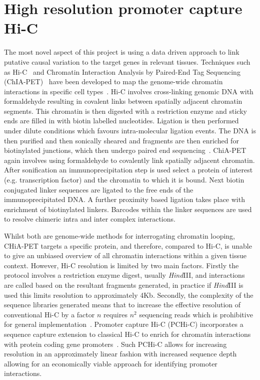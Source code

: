 \documentclass[a4paper,11pt]{report}
\begin{document}
\section{High resolution promoter capture Hi-C}
The most novel aspect of this project is using a data driven approach to link putative causal variation to the target genes in relevant tissues. Techniques such as Hi-C~\citep{Lieberman-AidenvanBerkumWilliamsEtAl2009} and  Chromatin Interaction Analysis by Paired-End Tag Sequencing (ChIA-PET)~\citep{FullwoodLiuPanEtAl2009} have been developed to map the genome-wide chromatin interactions in specific cell types~\citep{RaoHuntleyDurandEtAl2014}. Hi-C involves cross-linking genomic DNA with formaldehyde resulting in covalent links between spatially adjacent chromatin segments. This chromatin is then digested with a restriction enzyme and sticky ends are filled in with biotin labelled nucleotides. Ligation is then performed under dilute conditions which favours intra-molecular ligation events. The DNA is then purified and then sonically sheared and fragments are then enriched for biotinylated junctions, which then undergo paired end sequencing~\citep{vanBerkumLieberman-AidenWilliamsEtAl2010}. ChiA-PET again involves using formaldehyde to covalently link spatially adjacent chromatin. After sonification an immunoprecipitation step is used select a protein of interest (e.g. transcription factor) and the chromatin to which it is bound. Next biotin conjugated linker sequences are ligated to the free ends of the immunoprecipitated DNA. A further proximity based ligation takes place with enrichment of biotinylated linkers. Barcodes within the linker sequences are used to resolve chimeric intra and inter complex interactions. 

Whilst both are genome-wide methods for interrogating chromatin looping, CHiA-PET targets a specific protein, and therefore, compared to Hi-C, is unable to give an unbiased overview of all chromatin interactions within a given tissue context. However, Hi-C resolution is limited by two main factors. Firstly the protocol involves a restriction enzyme digest, usually \textit{Hind}III, and interactions are called based on the resultant fragments generated, in practice if \textit{Hind}III is used this limits resolution to approximately 4Kb. Secondly,  the complexity of the sequence libraries generated means that to increase the effective resolution of conventional Hi-C by a factor $n$ requires $n^{2}$ sequencing reads which is prohibitive for general implementation~\citep{JaegerMiglioriniHenrionEtAl2015}. Promoter capture Hi-C (PCHi-C) incorporates a sequence capture extension to classical Hi-C to enrich for chromatin interactions with protein coding gene promoters~\citep{Mifsud2015-fm}. Such PCHi-C allows for increasing resolution in an approximately linear fashion with increased sequence depth allowing for an economically viable approach for identifying promoter interactions. 
\end{document}
